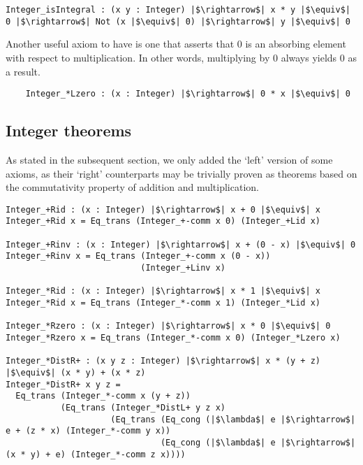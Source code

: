 \documentclass[12pt,twoside,maitrise]{dms}
\theoremstyle{definition}
\numberwithin{equation}{section}
\numberwithin{table}{chapter}
\numberwithin{figure}{chapter}
\begin{document}
\begin{verbatim}
Integer_isIntegral : (x y : Integer) |$\rightarrow$| x * y |$\equiv$| 0 |$\rightarrow$| Not (x |$\equiv$| 0) |$\rightarrow$| y |$\equiv$| 0
\end{verbatim}

Another useful axiom to have is one that asserts that 0 is an absorbing element
with respect to multiplication. In other words, multiplying by 0 always yields 0
as a result.

\begin{verbatim}
    Integer_*Lzero : (x : Integer) |$\rightarrow$| 0 * x |$\equiv$| 0
\end{verbatim}

\subsection*{Integer theorems}\label{subsec:int-theorems}
As stated in the subsequent section, we only added the `left' version of some
axioms, as their `right' counterparts may be trivially proven as theorems based
on the commutativity property of addition and multiplication.

\begin{verbatim}
Integer_+Rid : (x : Integer) |$\rightarrow$| x + 0 |$\equiv$| x
Integer_+Rid x = Eq_trans (Integer_+-comm x 0) (Integer_+Lid x)

Integer_+Rinv : (x : Integer) |$\rightarrow$| x + (0 - x) |$\equiv$| 0
Integer_+Rinv x = Eq_trans (Integer_+-comm x (0 - x))
                           (Integer_+Linv x)

Integer_*Rid : (x : Integer) |$\rightarrow$| x * 1 |$\equiv$| x
Integer_*Rid x = Eq_trans (Integer_*-comm x 1) (Integer_*Lid x)

Integer_*Rzero : (x : Integer) |$\rightarrow$| x * 0 |$\equiv$| 0
Integer_*Rzero x = Eq_trans (Integer_*-comm x 0) (Integer_*Lzero x)

Integer_*DistR+ : (x y z : Integer) |$\rightarrow$| x * (y + z) |$\equiv$| (x * y) + (x * z)
Integer_*DistR+ x y z =
  Eq_trans (Integer_*-comm x (y + z))
           (Eq_trans (Integer_*DistL+ y z x)
                     (Eq_trans (Eq_cong (|$\lambda$| e |$\rightarrow$| e + (z * x) (Integer_*-comm y x))
                               (Eq_cong (|$\lambda$| e |$\rightarrow$| (x * y) + e) (Integer_*-comm z x))))
\end{verbatim}
\end{document}
